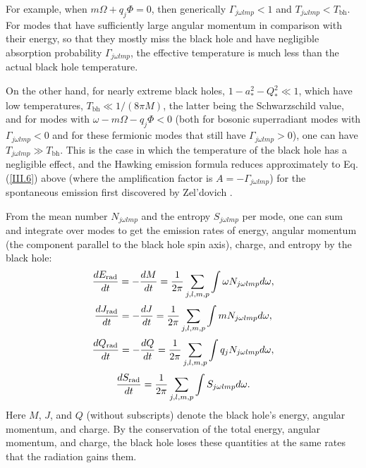 \documentclass[12pt]{article} \usepackage{latexsym} \textwidth 15cm
\begin{document}
For example, when $m\Omega+q_j\Phi = 0$, then generically
$\Gamma_{j\omega lmp} < 1$ and $T_{j\omega lmp} < T_{\mathrm{bh}}$.
For modes that have sufficiently large angular momentum in comparison
with their energy, so that they mostly miss the black hole and have
negligible absorption probability $\Gamma_{j\omega lmp}$, the
effective temperature is much less than the actual black hole
temperature.

On the other hand, for nearly extreme black holes, $1-a_*^2-Q_*^2 \ll
1$, which have low temperatures, $T_{\mathrm{bh}} \ll 1/(8\pi M)$, the
latter being the Schwarzschild value, and for modes with
$\omega-m\Omega-q_j\Phi < 0$ (both for bosonic superradiant modes with
$\Gamma_{j\omega lmp} < 0$ and for these fermionic modes that still
have $\Gamma_{j\omega lmp} > 0$), one can have $T_{j\omega lmp} \gg
T_{\mathrm{bh}}$.  This is the case in which the temperature of the
black hole has a negligible effect, and the Hawking emission formula
reduces approximately to Eq. (\ref{III.6}) above (where the
amplification factor is $A = - \Gamma_{j\omega lmp}$) for the
spontaneous emission first discovered by Zel'dovich \cite{Zel1,Zel2}.

From the mean number $N_{j\omega lmp}$ and the entropy $S_{j\omega
lmp}$ per mode, one can sum and integrate over modes to get the emission
rates of energy, angular momentum (the component parallel to the black
hole spin axis), charge, and entropy by the black hole:
 \begin{equation}
 {dE_{\mathrm{rad}}\over dt} = -{dM\over dt}
 = {1\over 2\pi}\sum_{j,l,m,p}\int \omega N_{j\omega lmp} d\omega,
 \label{eq:9}
 \end{equation}
 \begin{equation}
 {dJ_{\mathrm{rad}}\over dt} = -{dJ\over dt}
 = {1\over 2\pi}\sum_{j,l,m,p}\int m N_{j\omega lmp} d\omega,
 \label{eq:10}
 \end{equation}
 \begin{equation}
 {dQ_{\mathrm{rad}}\over dt} = -{dQ\over dt}
 = {1\over 2\pi}\sum_{j,l,m,p}\int q_j N_{j\omega lmp} d\omega,
 \label{eq:11}
 \end{equation}
 \begin{equation}
 {dS_{\mathrm{rad}}\over dt}
 = {1\over 2\pi}\sum_{j,l,m,p}\int S_{j\omega lmp} d\omega.
 \label{eq:12}
 \end{equation}
Here $M$, $J$, and $Q$ (without subscripts) denote the black hole's
energy, angular momentum, and charge.  By the conservation of the
total energy, angular momentum, and charge, the black hole loses these
quantities at the same rates that the radiation gains them.
\end{document}
